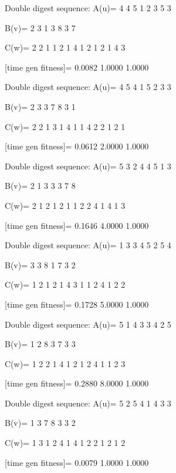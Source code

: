 Double digest sequence:
A(u)=
     4     4     5     1     2     3     5     3

B(v)=
     2     3     1     3     8     3     7

C(w)=
     2     2     1     1     2     1     4     1     2     1     2     1     4     3

[time gen fitness]=
    0.0082    1.0000    1.0000

Double digest sequence:
A(u)=
     4     5     4     1     5     2     3     3

B(v)=
     2     3     3     7     8     3     1

C(w)=
     2     2     1     3     1     4     1     1     4     2     2     1     2     1

[time gen fitness]=
    0.0612    2.0000    1.0000

Double digest sequence:
A(u)=
     5     3     2     4     4     5     1     3

B(v)=
     2     1     3     3     3     7     8

C(w)=
     2     1     2     1     2     1     1     2     2     4     1     4     1     3

[time gen fitness]=
    0.1646    4.0000    1.0000

Double digest sequence:
A(u)=
     1     3     3     4     5     2     5     4

B(v)=
     3     3     8     1     7     3     2

C(w)=
     1     2     1     2     1     4     3     1     1     2     4     1     2     2

[time gen fitness]=
    0.1728    5.0000    1.0000

Double digest sequence:
A(u)=
     5     1     4     3     3     4     2     5

B(v)=
     1     2     8     3     7     3     3

C(w)=
     1     2     2     1     4     1     2     1     2     4     1     1     2     3

[time gen fitness]=
    0.2880    8.0000    1.0000

Double digest sequence:
A(u)=
     5     2     5     4     1     4     3     3

B(v)=
     1     3     7     8     3     3     2

C(w)=
     1     3     1     2     4     1     4     1     2     2     1     2     1     2

[time gen fitness]=
    0.0079    1.0000    1.0000

